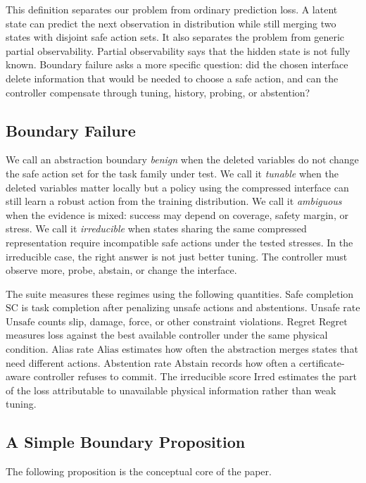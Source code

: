 \documentclass{article}
\newcommand{\safecomp}{\mathrm{SC}}
\newcommand{\unsafe}{\mathrm{Unsafe}}
\newcommand{\regret}{\mathrm{Regret}}
\newcommand{\alias}{\mathrm{Alias}}
\newcommand{\abstain}{\mathrm{Abstain}}
\newcommand{\irred}{\mathrm{Irred}}
\begin{document}
This definition separates our problem from ordinary prediction loss. A latent
state can predict the next observation in distribution while still merging two
states with disjoint safe action sets. It also separates the problem from generic
partial observability. Partial observability says that the hidden state is not
fully known. Boundary failure asks a more specific question: did the chosen
interface delete information that would be needed to choose a safe action, and can
the controller compensate through tuning, history, probing, or abstention?

\subsection{Boundary Failure}

We call an abstraction boundary \emph{benign} when the deleted variables do not
change the safe action set for the task family under test. We call it
\emph{tunable} when the deleted variables matter locally but a policy using the
compressed interface can still learn a robust action from the training
distribution. We call it \emph{ambiguous} when the evidence is mixed: success may
depend on coverage, safety margin, or stress. We call it \emph{irreducible} when
states sharing the same compressed representation require incompatible safe
actions under the tested stresses. In the irreducible case, the right answer is
not just better tuning. The controller must observe more, probe, abstain, or
change the interface.

The suite measures these regimes using the following quantities. Safe completion
$\safecomp$ is task completion after penalizing unsafe actions and abstentions.
Unsafe rate $\unsafe$ counts slip, damage, force, or other constraint violations.
Regret $\regret$ measures loss against the best available controller under the
same physical condition. Alias rate $\alias$ estimates how often the abstraction
merges states that need different actions. Abstention rate $\abstain$ records how
often a certificate-aware controller refuses to commit. The irreducible score
$\irred$ estimates the part of the loss attributable to unavailable physical
information rather than weak tuning.

\subsection{A Simple Boundary Proposition}

The following proposition is the conceptual core of the paper.
\end{document}

